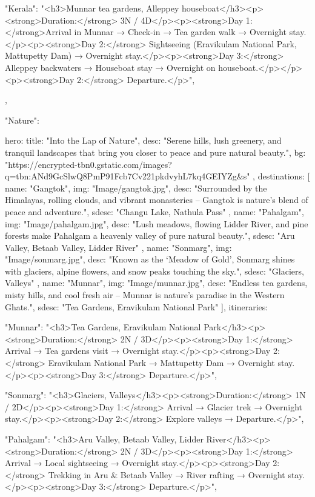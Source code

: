 {{{      "Kerala": "<h3>Munnar tea gardens, Alleppey houseboat</h3><p><strong>Duration:</strong> 3N / 4D</p><p><strong>Day 1:</strong>Arrival in Munnar → Check-in → Tea garden walk → Overnight stay.</p><p><strong>Day 2:</strong> Sightseeing (Eravikulam National Park, Mattupetty Dam) → Overnight stay.</p><p><strong>Day 3:</strong> Alleppey backwaters → Houseboat stay → Overnight on houseboat.</p></p><p><strong>Day 2:</strong> Departure.</p>",

    }
  },

"Nature": {
  hero: {
    title: "Into the Lap of Nature",
    desc: "Serene hills, lush greenery, and tranquil landscapes that bring you closer to peace and pure natural beauty.",
    bg: "https://encrypted-tbn0.gstatic.com/images?q=tbn:ANd9GcSlwQ8PmP91Fcb7Cv221pkdvyhL7kq4GEIYZg&s"
  },
  destinations: [
    { 
      name: "Gangtok", 
      img: "Image/gangtok.jpg", 
      desc: "Surrounded by the Himalayas, rolling clouds, and vibrant monasteries – Gangtok is nature’s blend of peace and adventure.", 
      sdesc: "Changu Lake, Nathula Pass" 
    },
    { 
      name: "Pahalgam", 
      img: "Image/pahalgam.jpg", 
      desc: "Lush meadows, flowing Lidder River, and pine forests make Pahalgam a heavenly valley of pure natural beauty.", 
      sdesc: "Aru Valley, Betaab Valley, Lidder River" 
    },
    { 
      name: "Sonmarg", 
      img: "Image/sonmarg.jpg", 
      desc: "Known as the ‘Meadow of Gold’, Sonmarg shines with glaciers, alpine flowers, and snow peaks touching the sky.", 
      sdesc: "Glaciers, Valleys" 
    },
    { 
      name: "Munnar", 
      img: "Image/munnar.jpg", 
      desc: "Endless tea gardens, misty hills, and cool fresh air – Munnar is nature’s paradise in the Western Ghats.", 
      sdesc: "Tea Gardens, Eravikulam National Park" 
    }
  ],
  itineraries: {
    "Munnar": "<h3>Tea Gardens, Eravikulam National Park</h3><p><strong>Duration:</strong> 2N / 3D</p><p><strong>Day 1:</strong> Arrival → Tea gardens visit → Overnight stay.</p><p><strong>Day 2:</strong> Eravikulam National Park → Mattupetty Dam → Overnight stay.</p><p><strong>Day 3:</strong> Departure.</p>",

    "Sonmarg": "<h3>Glaciers, Valleys</h3><p><strong>Duration:</strong> 1N / 2D</p><p><strong>Day 1:</strong> Arrival → Glacier trek → Overnight stay.</p><p><strong>Day 2:</strong> Explore valleys → Departure.</p>",

    "Pahalgam": "<h3>Aru Valley, Betaab Valley, Lidder River</h3><p><strong>Duration:</strong> 2N / 3D</p><p><strong>Day 1:</strong> Arrival → Local sightseeing → Overnight stay.</p><p><strong>Day 2:</strong> Trekking in Aru & Betaab Valley → River rafting → Overnight stay.</p><p><strong>Day 3:</strong> Departure.</p>",

}}}
